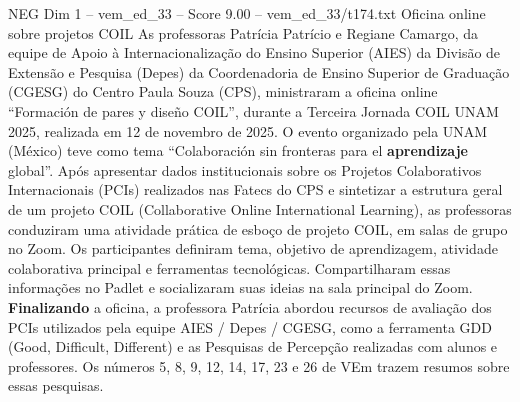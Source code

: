 \begin{textsample}{NEG Dim 1 – vem\_ed\_33 – Score 9.00 – vem\_ed\_33/t174.txt}  \label{ex:f1_neg_110}
Oficina online sobre projetos COIL As professoras Patrícia Patrício e Regiane Camargo, da equipe de Apoio à Internacionalização do Ensino Superior (AIES) da Divisão de Extensão e Pesquisa (Depes) da Coordenadoria de Ensino Superior de Graduação (CGESG) do Centro Paula Souza (CPS), ministraram a oficina online “Formación de pares y diseño COIL”, durante a Terceira Jornada COIL UNAM 2025, realizada em 12 de novembro de 2025.
O evento organizado pela UNAM (México) teve como tema “Colaboración sin fronteras para el \textbf{aprendizaje} global”.
Após apresentar dados institucionais sobre os Projetos Colaborativos Internacionais (PCIs) realizados nas Fatecs do CPS e sintetizar a estrutura geral de um projeto COIL (Collaborative Online International Learning), as professoras conduziram uma atividade prática de esboço de projeto COIL, em salas de grupo no Zoom.
Os participantes definiram tema, objetivo de aprendizagem, atividade colaborativa principal e ferramentas tecnológicas.
Compartilharam essas informações no Padlet e socializaram suas ideias na sala principal do Zoom. \textbf{Finalizando} a oficina, a professora Patrícia abordou recursos de avaliação dos PCIs utilizados pela equipe AIES / Depes / CGESG, como a ferramenta GDD (Good, Difficult, Different) e as Pesquisas de Percepção realizadas com alunos e professores.
Os números 5, 8, 9, 12, 14, 17, 23 e 26 de VEm trazem resumos sobre essas pesquisas.

\end{textsample}

